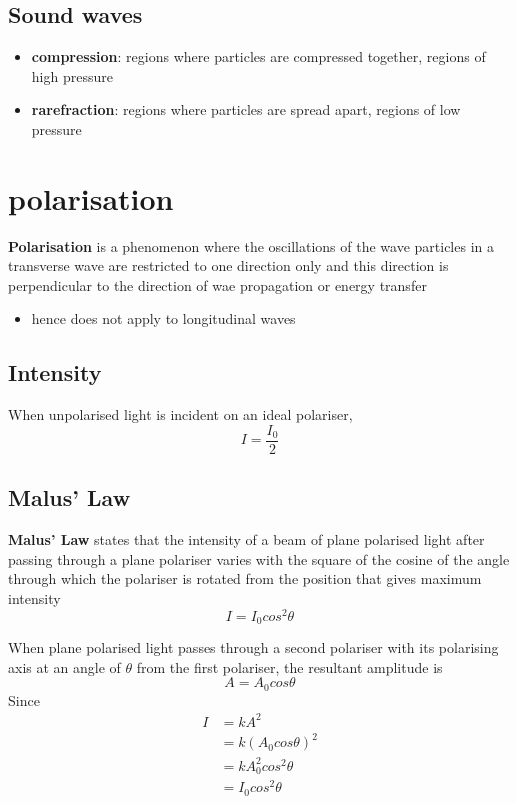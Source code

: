 \documentclass[a4paper, 10pt]{article}
\begin{document}
\subsection{Sound waves}
\begin{itemize}
   \item \textbf{compression}: regions where particles are compressed together, regions of high pressure
   \item \textbf{rarefraction}: regions where particles are spread apart, regions of low pressure
\end{itemize}	

\section{polarisation}
\begin{framed}
   \textbf{Polarisation} is a phenomenon where the oscillations of the wave particles in a transverse wave are restricted to one direction only and this direction is perpendicular to the direction of wae propagation or energy transfer
   \begin{itemize}
      \item hence does not apply to longitudinal waves
   \end{itemize}	
\end{framed}	

\subsection{Intensity}
When unpolarised light is incident on an ideal polariser, 
\[
I = \frac{I_0}{2}
\]

\subsection{Malus' Law}
\begin{framed}
   \textbf{Malus' Law} states that the intensity of a beam of plane polarised light after passing through a plane polariser varies with the square of the cosine of the angle through which the polariser is rotated from the position that gives maximum intensity
   \[
   I = I_0 cos^2 \theta
   \]
   
\end{framed}	


When plane polarised light passes through a second polariser with its polarising axis at an angle of $\theta$ from the first polariser, the resultant amplitude is
\[
 A = A_0 cos\theta
\]
Since 
\begin{align*}
   I &= kA^2 \\
     &= k(A_0 cos\theta)^2 \\
     &= kA_0^2 cos^2 \theta \\
     &= I_0 cos^2 \theta
\end{align*}	
\end{document}
